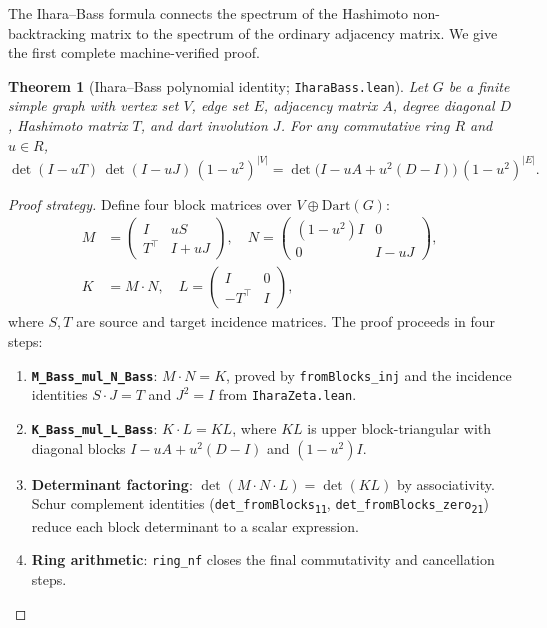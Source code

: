 \documentclass[12pt]{article}
\newtheorem{theorem}{Theorem}[section]
\newcommand{\card}[1]{\left\lvert #1 \right\rvert}
\DeclareMathOperator{\det}{det}
\begin{document}
The Ihara--Bass formula connects the spectrum of the Hashimoto
non-backtracking matrix to the spectrum of the ordinary adjacency
matrix.  We give the first complete machine-verified proof.

\begin{theorem}[Ihara--Bass polynomial identity; \texttt{IharaBass.lean}]
  \label{thm:ihara}
  Let $G$ be a finite simple graph with vertex set $V$, edge set $E$,
  adjacency matrix $A$, degree diagonal $D$, Hashimoto matrix $T$,
  and dart involution $J$.  For any commutative ring $R$ and $u \in R$,
  \[
    \det(I - uT)\,\det(I - uJ)\,(1-u^2)^{\card{V}}
    = \det\!\bigl(I - uA + u^2(D - I)\bigr)\,(1-u^2)^{\card{E}}.
  \]
\end{theorem}

\begin{proof}[Proof strategy]
  Define four block matrices over $V \oplus \mathrm{Dart}(G)$:
  \begin{align*}
    M &= \begin{pmatrix} I & uS \\ T^\top & I + uJ \end{pmatrix}, \quad
    N = \begin{pmatrix} (1-u^2)I & 0 \\ 0 & I - uJ \end{pmatrix}, \\
    K &= M \cdot N, \quad
    L = \begin{pmatrix} I & 0 \\ -T^\top & I \end{pmatrix},
  \end{align*}
  where $S, T$ are source and target incidence matrices.  The proof
  proceeds in four steps:
  \begin{enumerate}[(1)]
    \item \textbf{\texttt{M\_Bass\_mul\_N\_Bass}}: $M \cdot N = K$,
      proved by \texttt{fromBlocks\_inj} and the incidence identities
      $S \cdot J = T$ and $J^2 = I$ from \texttt{IharaZeta.lean}.
    \item \textbf{\texttt{K\_Bass\_mul\_L\_Bass}}: $K \cdot L = KL$,
      where $KL$ is upper block-triangular with diagonal blocks
      $I - uA + u^2(D-I)$ and $(1-u^2)I$.
    \item \textbf{Determinant factoring}: $\det(M \cdot N \cdot L)
      = \det(KL)$ by associativity.  Schur complement identities
      (\texttt{det\_fromBlocks\textsubscript{11}},
       \texttt{det\_fromBlocks\_zero\textsubscript{21}}) reduce each
      block determinant to a scalar expression.
    \item \textbf{Ring arithmetic}: \texttt{ring\_nf} closes the final
      commutativity and cancellation steps.
  \end{enumerate}
\end{proof}
\end{document}

